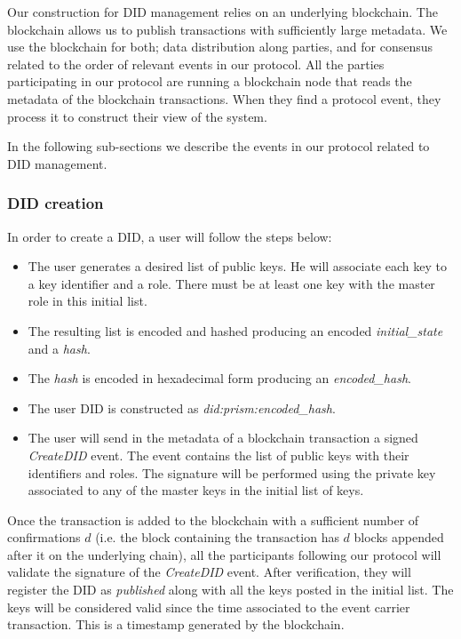 \documentclass[10pt,a4paper]{article}
\begin{document}
Our construction for DID management relies on an underlying blockchain. The blockchain allows us to publish transactions with sufficiently large metadata. We use the blockchain for both; data distribution along parties, and for consensus related to the order of relevant events in our protocol. All the parties participating in our protocol are running a blockchain node that reads the metadata of the blockchain transactions. When they find a protocol event, they process it to construct their view of the system.

In the following sub-sections we describe the events in our protocol related to DID management.

\subsubsection{DID creation}

In order to create a DID, a user will follow the steps below:

\begin{itemize}
\item The user generates a desired list of public keys. He will associate each key to a key identifier and a role.
      There must be at least one key with the master role in this initial list.
\item The resulting list is encoded and hashed producing an encoded \emph{initial\_state} and a \emph{hash}.
\item The \emph{hash} is encoded in hexadecimal form producing an \emph{encoded\_hash}.
\item The user DID is constructed as \emph{did:prism:encoded\_hash}.
\item The user will send in the metadata of a blockchain transaction a signed \emph{CreateDID} event. 
      The event contains the list of public keys with their identifiers and roles.
      The signature will be performed using the private key associated to any of the master keys in the initial list of keys.
\end{itemize}

Once the transaction is added to the blockchain with a sufficient number of confirmations $d$ (i.e. the block containing the transaction has $d$ blocks appended after it on the underlying chain), all the participants following our protocol will validate the signature of the \emph{CreateDID} event. After verification, they will register the DID as \emph{published} along with all the keys posted in the initial list. The keys will be considered valid since the time associated to the event carrier transaction. This is a timestamp generated by the blockchain.
\end{document}
